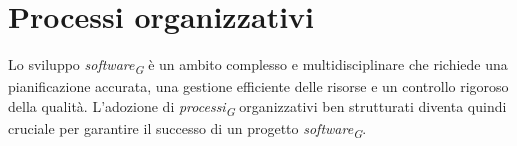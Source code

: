 \section{Processi organizzativi}
Lo sviluppo \textit{software}\textsubscript{\textit{G}} è un ambito complesso e multidisciplinare che richiede una pianificazione accurata, una gestione efficiente delle risorse e un controllo rigoroso della qualità. L'adozione di \textit{processi}\textsubscript{\textit{G}} organizzativi ben strutturati diventa quindi cruciale per garantire il successo di un progetto \textit{software}\textsubscript{\textit{G}}.






